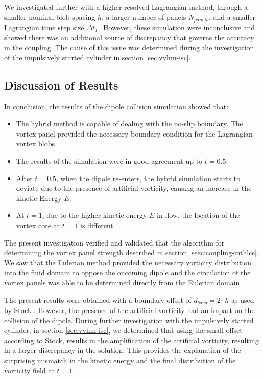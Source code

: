 We investigated further with a higher resolved Lagrangian method, through a smaller nominal blob spacing $h$, a larger number of panels $N_{panels}$, and a smaller Lagrangian time step size $\Delta t_L$. However, these simulation were inconclusive and showed there was an additional source of discrepancy that governs the accuracy in the coupling. The cause of this issue was determined during the investigation of the impulsively started cylinder in section \ref{sec:vvhm-isc}.%


\subsection{Discussion of Results}

In conclusion, the results of the dipole collision simulation showed that:
\begin{itemize}
\item The hybrid method is capable of dealing with the no-slip boundary. The vortex panel provided the necessary boundary condition for the Lagrangian vortex blobs.
\item The results of the simulation were in good agreement up to $t=0.5$.
\item After $t=0.5$, when the dipole re-enters, the hybrid simulation starts to deviate due to the presence of artificial vorticity, causing an increase in the kinetic Energy $E$.
\item At $t=1$, due to the higher kinetic energy $E$ in flow, the location of the vortex core at $t=1$ is different.
\end{itemize}

The present investigation verified and validated that the algorithm for determining the vortex panel strength described in section \ref{seec:coupling-mthlcs}. We saw that the Eulerian method provided the necessary vorticity distribution into the fluid domain to oppose the oncoming dipole and the circulation of the vortex panels was able to be determined directly from the Eulerian domain.

The present results were obtained with a boundary offset of $d_{bdry}=2\cdot{h}$ as used by Stock \cite{Stock2010a}. However, the presence of the artificial vorticity had an impact on the collision of the dipole. During further investigation with the impulsively started cylinder, in section \ref{sec:vvhm-isc}, we determined that using the small offset according to Stock, results in the amplification of the artificial vorticity, resulting in a larger discrepancy in the solution. This provides the explanation of the surprising mismatch in the kinetic energy and the final distribution of the vorticity field at $t=1$.


